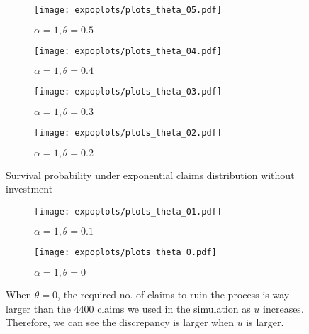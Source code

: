 \documentclass[12pt]{article}
\begin{document}
\begin{figure}[!htbp]
\begin{subfigure}{0.5\textwidth}
\texttt{[image: expoplots/plots\_theta\_05.pdf]} 
\caption{\(\alpha=1, \theta=0.5\)}
\label{exp_noinv_theta05}
\end{subfigure}
\begin{subfigure}{0.5\textwidth}
\texttt{[image: expoplots/plots\_theta\_04.pdf]} 
\caption{\(\alpha=1, \theta=0.4\)}
\label{exp_noinv_theta04}
\end{subfigure}
\begin{subfigure}{0.5\textwidth}
\texttt{[image: expoplots/plots\_theta\_03.pdf]} 
\caption{\(\alpha=1, \theta=0.3\)}
\label{exp_noinv_theta03}
\end{subfigure}
\begin{subfigure}{0.5\textwidth}
\texttt{[image: expoplots/plots\_theta\_02.pdf]} 
\caption{\(\alpha=1, \theta=0.2\)}
\label{exp_noinv_theta02}
\end{subfigure}
\caption{Survival probability under exponential claims distribution without investment}
\label{fig:expo-noinv-part1}
\end{figure}
\begin{figure}[!htbp]
\begin{subfigure}{0.5\textwidth}
\texttt{[image: expoplots/plots\_theta\_01.pdf]} 
\caption{\(\alpha=1, \theta=0.1\)}
\label{exp_noinv_theta01}
\end{subfigure}
\begin{subfigure}{0.5\textwidth}
\texttt{[image: expoplots/plots\_theta\_0.pdf]} 
\caption{\(\alpha=1, \theta=0\)}
\label{exp_noinv_theta0}
\end{subfigure}
\caption{When \(\theta=0\), the required no. of claims to ruin the process is way larger than the 4400 claims we used in the simulation as \(u\) increases. Therefore, we can see the discrepancy is larger when \(u\) is larger.}
\label{fig:expo-noinv-part2}
\end{figure}

\end{document}
